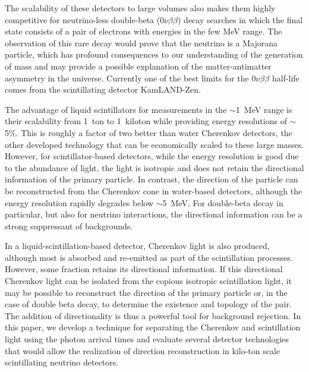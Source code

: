 \documentclass[aps,prc,twocolumn,groupedaddress,showpacs,amsmath,amssymb,floatfix,superscriptaddress]{revtex4}
\begin{document}
The scalability of these detectors to large volumes also makes them
highly competitive for neutrino-less double-beta ($0\nu\beta\beta$)
decay searches in which the final state consists of a pair of
electrons with energies in the few MeV range.  The observation of this
rare decay would prove that the neutrino is a Majorana particle, which
has profound consequences to our understanding of the generation of
mass and may provide a possible explanation of the matter-antimatter
asymmetry in the universe.  Currently one of the best limits for the
$0\nu\beta\beta$ half-life comes from the scintillating detector
KamLAND-Zen\cite{KZ0nu}.

The advantage of liquid scintillators for measurements in the
$\sim$1~MeV range is their scalability from 1~ton to 1~kiloton while
providing energy resolutions of $\sim$5\%. This is roughly a factor of
two better than water Cherenkov detectors, the other developed
technology that can be economically scaled to these large
masses. However, for scintillator-based detectors, while the energy
resolution is good due to the abundance of light, the light is
isotropic and does not retain the directional information of the
primary particle.  In contrast, the direction of the particle can be
reconstructed from the Cherenkov cone in water-based detectors,
although the energy resolution rapidly degrades below $\sim$5~MeV. For
double-beta decay in particular, but also for neutrino interactions,
the directional information can be a strong suppressant of
backgrounds.

In a liquid-scintillation-based detector, Cherenkov light is also
produced, although most is absorbed and re-emitted as part of the
scintillation processes.  However, some fraction retains its
directional information. If this directional Cherenkov light can be
isolated from the copious isotropic scintillation light, it may be
possible to reconstruct the direction of the primary particle or, in
the case of double beta decay, to determine the existence and topology
of the pair.  The addition of directionality is thus a powerful tool
for background rejection.  In this paper, we develop a technique for
separating the Cherenkov and scintillation light using the photon arrival
times and evaluate several detector technologies that would allow
the realization of direction reconstruction in kilo-ton scale
scintillating neutrino detectors.
\end{document}
